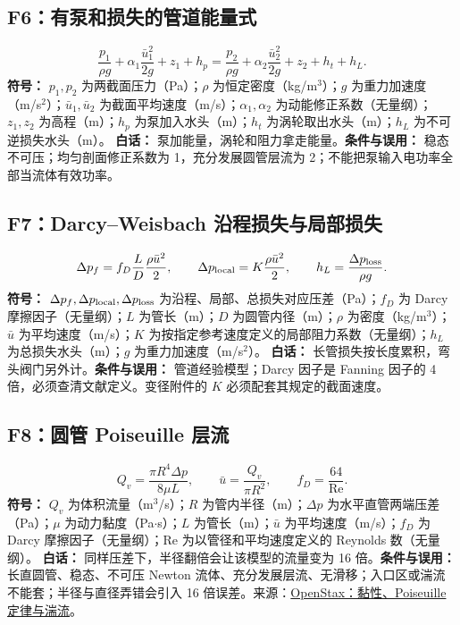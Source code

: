 \documentclass[UTF8,zihao=-4,openany,oneside,fontset=windows]{ctexbook}
\begin{document}
\subsection{F6：有泵和损失的管道能量式}
\begin{equation}
\frac{p_1}{\rho g}+\alpha_1\frac{\bar u_1^2}{2g}+z_1+h_p=\frac{p_2}{\rho g}+\alpha_2\frac{\bar u_2^2}{2g}+z_2+h_t+h_L.
\end{equation}
\textbf{符号：} $p_1,p_2$ 为两截面压力（Pa）；$\rho$ 为恒定密度（kg/m$^3$）；$g$ 为重力加速度（m/s$^2$）；$\bar u_1,\bar u_2$ 为截面平均速度（m/s）；$\alpha_1,\alpha_2$ 为动能修正系数（无量纲）；$z_1,z_2$ 为高程（m）；$h_p$ 为泵加入水头（m）；$h_t$ 为涡轮取出水头（m）；$h_L$ 为不可逆损失水头（m）。
\textbf{白话：} 泵加能量，涡轮和阻力拿走能量。\textbf{条件与误用：} 稳态不可压；均匀剖面修正系数为 1，充分发展圆管层流为 2；不能把泵输入电功率全部当流体有效功率。

\subsection{F7：Darcy--Weisbach 沿程损失与局部损失}
\begin{equation}
\Delta p_f=f_D\frac LD\frac{\rho\bar u^2}{2},\qquad \Delta p_{\rm local}=K\frac{\rho\bar u^2}{2},\qquad h_L=\frac{\Delta p_{\rm loss}}{\rho g}.
\end{equation}
\textbf{符号：} $\Delta p_f,\Delta p_{\rm local},\Delta p_{\rm loss}$ 为沿程、局部、总损失对应压差（Pa）；$f_D$ 为 Darcy 摩擦因子（无量纲）；$L$ 为管长（m）；$D$ 为圆管内径（m）；$\rho$ 为密度（kg/m$^3$）；$\bar u$ 为平均速度（m/s）；$K$ 为按指定参考速度定义的局部阻力系数（无量纲）；$h_L$ 为总损失水头（m）；$g$ 为重力加速度（m/s$^2$）。
\textbf{白话：} 长管损失按长度累积，弯头阀门另外计。\textbf{条件与误用：} 管道经验模型；Darcy 因子是 Fanning 因子的 4 倍，必须查清文献定义。变径附件的 $K$ 必须配套其规定的截面速度。

\subsection{F8：圆管 Poiseuille 层流}
\begin{equation}
Q_v=\frac{\pi R^4\Delta p}{8\mu L},\qquad \bar u=\frac{Q_v}{\pi R^2},\qquad f_D=\frac{64}{\mathrm{Re}}.
\end{equation}
\textbf{符号：} $Q_v$ 为体积流量（m$^3$/s）；$R$ 为管内半径（m）；$\Delta p$ 为水平直管两端压差（Pa）；$\mu$ 为动力黏度（Pa$\cdot$s）；$L$ 为管长（m）；$\bar u$ 为平均速度（m/s）；$f_D$ 为 Darcy 摩擦因子（无量纲）；$\mathrm{Re}$ 为以管径和平均速度定义的 Reynolds 数（无量纲）。
\textbf{白话：} 同样压差下，半径翻倍会让该模型的流量变为 16 倍。\textbf{条件与误用：} 长直圆管、稳态、不可压 Newton 流体、充分发展层流、无滑移；入口区或湍流不能套；半径与直径弄错会引入 16 倍误差。来源：\href{https://openstax.org/books/university-physics-volume-1/pages/14-7-viscosity-and-turbulence}{OpenStax：黏性、Poiseuille 定律与湍流}。
\end{document}

